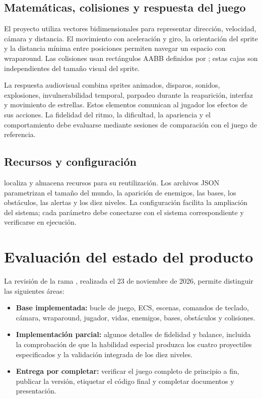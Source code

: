 \documentclass[12pt,letterpaper]{report}
\newcommand{\archivo}[1]{\texttt{\detokenize{#1}}}
\begin{document}
\section{Matemáticas, colisiones y respuesta del juego}
El proyecto utiliza vectores bidimensionales para representar dirección, velocidad, cámara y distancia. El movimiento con aceleración y giro, la orientación del sprite y la distancia mínima entre posiciones permiten navegar un espacio con wraparound. Las colisiones usan rectángulos AABB definidos por \archivo{CHitBox}; estas cajas son independientes del tamaño visual del sprite.

La respuesta audiovisual combina sprites animados, disparos, sonidos, explosiones, invulnerabilidad temporal, parpadeo durante la reaparición, interfaz y movimiento de estrellas. Estos elementos comunican al jugador los efectos de sus acciones. La fidelidad del ritmo, la dificultad, la apariencia y el comportamiento debe evaluarse mediante sesiones de comparación con el juego de referencia.

\section{Recursos y configuración}
\archivo{ServiceLocator} localiza y almacena recursos para su reutilización. Los archivos JSON parametrizan el tamaño del mundo, la aparición de enemigos, las bases, los obstáculos, las alertas y los diez niveles. La configuración facilita la ampliación del sistema; cada parámetro debe conectarse con el sistema correspondiente y verificarse en ejecución.

\chapter{Evaluación del estado del producto}

La revisión de la rama \archivo{main}, realizada el 23 de noviembre de 2026, permite distinguir las siguientes áreas:
\begin{itemize}[leftmargin=*]
  \item \textbf{Base implementada:} bucle de juego, ECS, escenas, comandos de teclado, cámara, wraparound, jugador, vidas, enemigos, bases, obstáculos y colisiones.
  \item \textbf{Implementación parcial:} algunos detalles de fidelidad y balance, incluida la comprobación de que la habilidad especial produzca los cuatro proyectiles especificados y la validación integrada de los diez niveles.
  \item \textbf{Entrega por completar:} verificar el juego completo de principio a fin, publicar la versión, etiquetar el código final y completar documentos y presentación.
\end{itemize}
\end{document}
